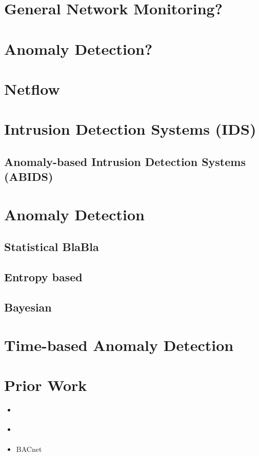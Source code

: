 
\section{General Network Monitoring?}

\section{Anomaly Detection?}

\section{Netflow}

\section{Intrusion Detection Systems (IDS)}
\subsection{Anomaly-based Intrusion Detection Systems (ABIDS)}

\section{Anomaly Detection}
\subsection{Statistical BlaBla}
\subsection{Entropy based}
\subsection{Bayesian}

\section{Time-based Anomaly Detection}

\section{Prior Work}

\begin{itemize}
	\item \parencite{Yang2006}
	\item \parencite{Celeda2012}
	\item \parencite{Pan2014} BACnet
\end{itemize}